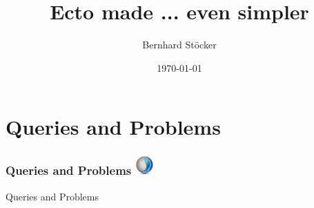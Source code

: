 \documentclass{beamer}
\title[Ecto made even simpler]{Ecto made \cancel{simple}... even simpler} %
\author{Bernhard St\"ocker} %
\institute[UCLA] %
{
Recogizer Group GmbH\\ %
\medskip
\textit{bernhard.stoecker@recogizer.de} %
}
\date{\today} %
\begin{document}
\begin{frame}
\titlepage %
\end{frame}



\section{Queries and Problems} %


\begin{frame}
\frametitle{Queries and Problems \hfill \includegraphics[width=0.05\textwidth]{recogizer_logo_small.png}}
\Huge{\centerline{Queries and Problems}}
\end{frame}

\end{document}
